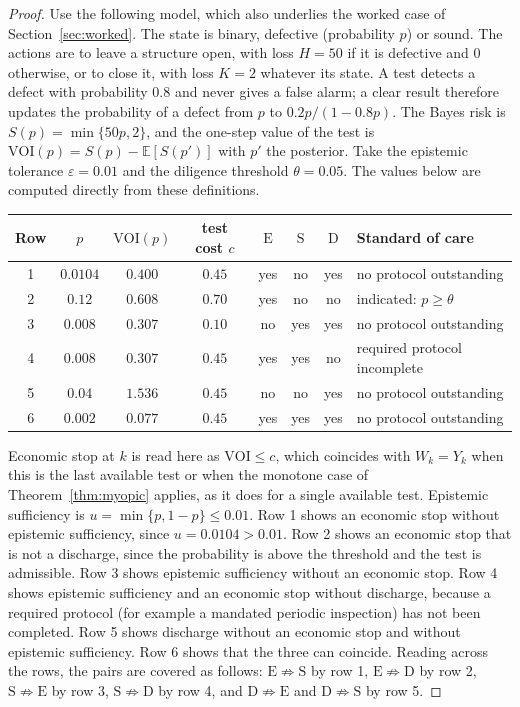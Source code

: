 \documentclass[11pt]{article}
\newcommand{\E}{\mathbb E}
\theoremstyle{plain}
\theoremstyle{definition}
\begin{document}
\begin{proof}
Use the following model, which also underlies the worked case of Section~\ref{sec:worked}. The state is binary, defective (probability $p$) or sound. The actions are to leave a structure open, with loss $H=50$ if it is defective and $0$ otherwise, or to close it, with loss $K=2$ whatever its state. A test detects a defect with probability $0.8$ and never gives a false alarm; a clear result therefore updates the probability of a defect from $p$ to $0.2p/(1-0.8p)$. The Bayes risk is $S(p)=\min\{50p,2\}$, and the one-step value of the test is $\mathrm{VOI}(p)=S(p)-\E[S(p')]$ with $p'$ the posterior. Take the epistemic tolerance $\varepsilon=0.01$ and the diligence threshold $\theta=0.05$. The values below are computed directly from these definitions.

\begin{center}
\small
\begin{tabular}{@{}cccccccl@{}}
\hline
Row & $p$ & $\mathrm{VOI}(p)$ & test cost $c$ & $\mathrm{E}$ & $\mathrm{S}$ & $\mathrm{D}$ & Standard of care\\
\hline
1 & $0.0104$ & $0.400$ & $0.45$ & yes & no & yes & no protocol outstanding\\
2 & $0.12$ & $0.608$ & $0.70$ & yes & no & no & indicated: $p\ge\theta$\\
3 & $0.008$ & $0.307$ & $0.10$ & no & yes & yes & no protocol outstanding\\
4 & $0.008$ & $0.307$ & $0.45$ & yes & yes & no & required protocol incomplete\\
5 & $0.04$ & $1.536$ & $0.45$ & no & no & yes & no protocol outstanding\\
6 & $0.002$ & $0.077$ & $0.45$ & yes & yes & yes & no protocol outstanding\\
\hline
\end{tabular}
\end{center}

Economic stop at $k$ is read here as $\mathrm{VOI}\le c$, which coincides with $W_k=Y_k$ when this is the last available test or when the monotone case of Theorem~\ref{thm:myopic} applies, as it does for a single available test. Epistemic sufficiency is $u=\min\{p,1-p\}\le0.01$. Row 1 shows an economic stop without epistemic sufficiency, since $u=0.0104>0.01$. Row 2 shows an economic stop that is not a discharge, since the probability is above the threshold and the test is admissible. Row 3 shows epistemic sufficiency without an economic stop. Row 4 shows epistemic sufficiency and an economic stop without discharge, because a required protocol (for example a mandated periodic inspection) has not been completed. Row 5 shows discharge without an economic stop and without epistemic sufficiency. Row 6 shows that the three can coincide. Reading across the rows, the pairs are covered as follows: $\mathrm{E}\not\Rightarrow\mathrm{S}$ by row 1, $\mathrm{E}\not\Rightarrow\mathrm{D}$ by row 2, $\mathrm{S}\not\Rightarrow\mathrm{E}$ by row 3, $\mathrm{S}\not\Rightarrow\mathrm{D}$ by row 4, and $\mathrm{D}\not\Rightarrow\mathrm{E}$ and $\mathrm{D}\not\Rightarrow\mathrm{S}$ by row 5.
\end{proof}
\end{document}
